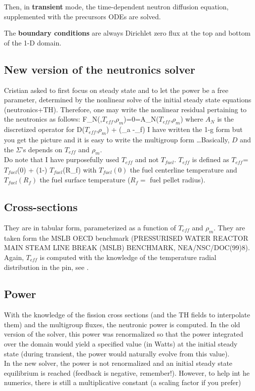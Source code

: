 \documentclass[11pt]{article}
\newcommand{\Tf}{\ensuremath{T_{\textit{fuel}}}\xspace}
\newcommand{\Teff}{\ensuremath{T_{\textit{eff}}}\xspace}
\newcommand{\ro}{\ensuremath{\rho_{\textit{m}}}\xspace}
\begin{document}
Then, in {\bf transient} mode, the time-dependent neutron diffusion equation, supplemented with the precursors ODEs are solved.

The {\bf boundary conditions} are always Dirichlet zero flux at the top and bottom of the 1-D domain.

\subsection{New version of the neutronics solver}

Cristian asked to first focus on steady state and to let the power be a free parameter, determined by the nonlinear solve of the initial steady state equations (neutronics+TH). Therefore, one may write the nonlinear residual pertaining to the neutronics as follows:
\be
F_N(\phi,\Teff,\ro)=0=A_N(\Teff,\ro)\phi
\ee
where $A_N$ is the discretized operator for
\be
\div D(\Teff,\ro) \grad \cdot + (\Sigma_a -\nu \Sigma_f) \cdot
\ee
I have written the 1-g form but you get the picture and it is easy to write the multigroup form \ldots Basically, $D$ and the $\Sigma$'s depends on \Teff and \ro.\\
Do note that I have purposefully used \Teff and not \Tf. \Teff is defined as
\be
\Teff = \alpha \Tf(0) + (1-\alpha) \Tf(R_f)
\label{eq:teff}
\ee
with $\Tf(0)$ the fuel centerline temperature and $\Tf(R_f)$ the fuel surface temperature ($R_f=$ fuel pellet radius).

\subsection{Cross-sections}

They are in tabular form, parameterized as a function of \Teff and \ro. They are taken form the MSLB OECD benchmark (PRESSURISED WATER REACTOR MAIN STEAM LINE BREAK (MSLB) BENCHMARK, NEA/NSC/DOC(99)8). Again, \Teff is computed with the knowledge of the temperature radial distribution in the pin, see .

\subsection{Power}

With the knowledge of the fission cross sections (and the TH fields to interpolate them) and the multigroup fluxes, the neutronic power is computed. In the old version of the solver, this power was renormalized so that the power integrated over the domain would yield a specified value (in Watts) at the initial steady state (during transient, the power would naturally evolve from this value).\\
In the new solver, the power is not renormalized and an initial steady state equilibrium is reached (feedback is negative, remember!). However, to help int he numerics, there is still a multiplicative constant (a scaling factor if you prefer)
\end{document}
